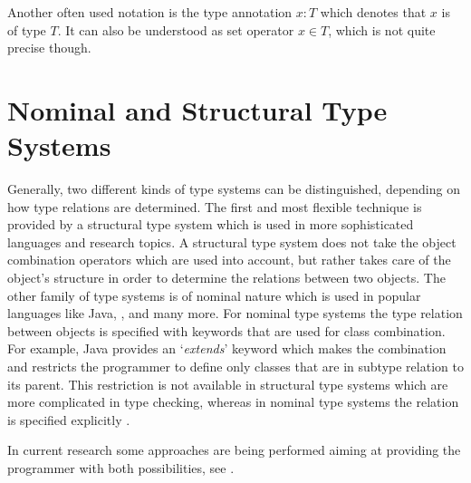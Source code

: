 \begin{mathpar}
\end{mathpar}

Another often used notation is the type annotation $x:T$ which denotes
that $x$ is of type $T$. It can also be understood as set operator
$x \in T$, which is not quite precise though.

\section{Nominal and Structural Type Systems}


Generally, two different kinds of type systems can be distinguished,
depending on how type relations are determined. The first and most
flexible technique is provided by a structural type system which is
used in more sophisticated languages and research topics. A structural
type system does not take the object combination operators which are
used into account, but rather takes care of the object's structure in
order to determine the relations between two objects. The other family
of type systems is of nominal nature which is used in popular languages
like Java, \cs, \cpp and many more. For nominal type systems the type
relation between objects is specified with keywords that are used for
class combination. For example, Java provides an `\emph{extends}' keyword
which makes the combination and restricts the programmer to define only
classes that are in subtype relation to its parent. This restriction is
not available in structural type systems which are more complicated in
type checking, whereas in nominal type systems the relation is specified
explicitly \cite{malayeri_integrating_2008,pierce_types_2002}.

In current research some approaches are being performed aiming
at providing the programmer with both possibilities, see
\cite{findler_semantic_2004,gil_whiteoak:_2008,malayeri_integrating_2008}.

